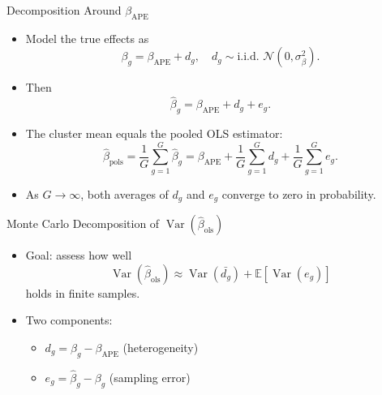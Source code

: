 \documentclass[
  ignorenonframetext,
]{beamer}
\providecommand{\tightlist}{%
  \setlength{\itemsep}{0pt}\setlength{\parskip}{0pt}}
\begin{document}
\begin{frame}{Decomposition Around \(\beta_{\text{APE}}\)}
\label{decomposition-around-beta_textape}
\begin{itemize}
\tightlist
\item
  Model the true effects as \[
  \beta_g = \beta_{\text{APE}} + d_g,\quad
  d_g \sim \text{i.i.d. } \mathcal{N}(0,\sigma^2_\beta).
  \]
\item
  Then \[
  \hat{\beta}_g = \beta_{\text{APE}} + d_g + e_g.
  \]
\item
  The cluster mean equals the pooled OLS estimator: \[
  \hat{\beta}_{\text{pols}}
  = \frac{1}{G}\sum_{g=1}^G \hat{\beta}_g
  = \beta_{\text{APE}}
    + \frac{1}{G}\sum_{g=1}^G d_g
    + \frac{1}{G}\sum_{g=1}^G e_g.
  \]
\item
  As \(G \to \infty\), both averages of \(d_g\) and \(e_g\) converge to
  zero in probability.
\end{itemize}
\end{frame}

\begin{frame}{Monte Carlo Decomposition of
\(\operatorname{Var}(\hat{\beta}_{\text{ols}})\)}
\label{monte-carlo-decomposition-of-operatornamevarhatbeta_textols}
\begin{itemize}
\tightlist
\item
  Goal: assess how well \[
  \operatorname{Var}(\hat{\beta}_{\text{ols}})
  \approx
  \operatorname{Var}(\bar{d_g})
  +
  \mathbb{E}\!\left[ \operatorname{Var}(e_g) \right]
  \] holds in finite samples.
\item
  Two components:

  \begin{itemize}
  \tightlist
  \item
    \(d_g = \beta_g - \beta_{\text{APE}}\) (heterogeneity)
  \item
    \(e_g = \hat{\beta}_g - \beta_g\) (sampling error)
  \end{itemize}
\end{itemize}
\end{frame}
\end{document}
